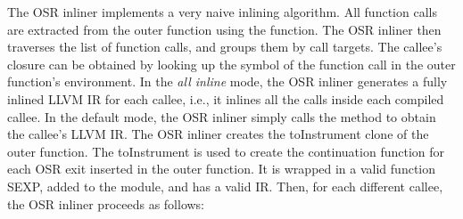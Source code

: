 The OSR inliner implements a very naive inlining algorithm.
All function calls are extracted from the outer function using the  function.
The OSR inliner then traverses the list of function calls, and groups them by call targets.
The callee's closure can be obtained by looking up the symbol of the function call in the outer function's environment.
In the \textit{all inline} mode, the OSR inliner generates a fully inlined LLVM IR for each callee, i.e., it inlines all the calls inside each compiled callee. 
In the default mode, the OSR inliner simply calls the  method to obtain the callee's LLVM IR.
The OSR inliner creates the toInstrument clone of the outer function.
The toInstrument is used to create the continuation function for each OSR exit inserted in the outer function.
It is wrapped in a valid function SEXP, added to the module, and has a valid IR.
Then, for each different callee, the OSR inliner proceeds as follows: 
